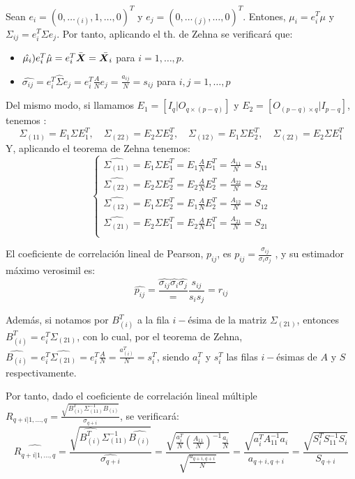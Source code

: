     Sean $e_i = (0,\dots_{(i)},1,\dots,0)^T$ y $e_j = (0,\dots_{(j)},\dots,0)^T$. Entones, $\mu_i = e_i^T \mu$ y $\Sigma_{ij} = e_i^T \Sigma e_j$. Por tanto, aplicando el th. de Zehna se verificará que:
    \begin{itemize}
    \item $\hat{\mu_i} ) e_i^T \hat{\mu} = e_i^T \bar{\boldsymbol{X}} = \bar{\boldsymbol{X}_i}$ para $i = 1,\dots,p$.
      \item $\hat{\sigma_{ij}} = e_i^T \hat{\Sigma}e_j = e_i^T \frac{A}{N}e_j = \frac{a_{ij}}{N} = s_{ij}$ para $i,j = 1,\dots,p$
    \end{itemize}

    Del mismo modo, si llamamos $E_1 =[ I_q | O_{q\times (p-q)}]$ y $E_2 = [O_{(p-q)\times q} | I_{p-q}]$, tenemos :
    \[
\Sigma_{(11)} = E_1 \Sigma E_1^T, \quad \Sigma_{(22)} = E_2 \Sigma E_2^T, \quad \Sigma_{(12)} = E_1 \Sigma E_2^T, \quad  \Sigma_{(22)} = E_2 \Sigma E_1^T
\]
Y, aplicando el teorema de Zehna tenemos:
\[
\begin{cases}
  \hat{\Sigma_{(11)}} = E_1 \Sigma E_1^T = E_1\frac{A}{N}E_1^T = \frac{A_{11}}{N} = S_{11} \\
  \hat{\Sigma_{(22)}} = E_2 \Sigma E_2^T = E_2\frac{A}{N}E_2^T = \frac{A_{22}}{N} = S_{22} \\

  \hat{\Sigma_{(12)}} = E_1 \Sigma E_2^T = E_1\frac{A}{N}E_2^T = \frac{A_{12}}{N} = S_{12} \\
  \hat{\Sigma_{(21)}} = E_2 \Sigma E_1^T = E_2\frac{A}{N}E_1^T = \frac{A_{21}}{N} = S_{21} \\
  \end{cases}
\]


\begin{ndef}
  El coeficiente de correlación lineal de Pearson, $p_{ij}$, es $p_{ij} = \frac{\sigma_{ij}}{\sigma_i \sigma_j}$ , y su estimador máximo verosimil es:
  \[
\hat{p_{ij}} = \frac{\hat{\sigma_{ij}}{\hat{\sigma_i}\hat{\sigma_j}}} = \frac{s_{ij}}{s_i s_j} = r_{ij}
  \]
\end{ndef}

Además, si notamos por $B_{(i)}^T$ a la fila $i-$ésima de la matriz $\Sigma_{(21)}$, entonces $B_{(i)}^T = e_i^T \Sigma_{(21)}$, con lo cual, por el teorema de Zehna, $\hat{B_{(i)}} = e_i^T \hat{\Sigma_{(21)}} = e_i^T \frac{A}{N} = \frac{a_{(i)}^T}{N} = s_i^T $, siendo $a_i^T$ y $s_i^T$ las filas $i-$ésimas de $A$ y $S$ respectivamente.

Por tanto, dado el coeficiente de correlación lineal múltiple $R_{q+i | 1,\dots,q} = \frac{\sqrt{B_{(i)}^T \Sigma_{(11)}^{-1} B_{(i)}}}{\sigma_{q+i}}$, se verificará:
\[
\hat{R_{q+i | 1,\dots,q}} = \frac{\sqrt{\hat{B_{(i)}^T}\hat{ \Sigma_{(11)}^{-1}} \hat{B_{(i)}} } } {\hat{\sigma_{q+i}}} =  \frac{\sqrt{\frac{a_i^T}{N} (\frac{A_{11}}{N})^{-1} \frac{a_i}{N}   }}{\sqrt{\frac{a_{q+i,q+i}}{N}}} = \frac{\sqrt{a_i^T A_{11}^{-1} a_i       }}{a_{q+i,q+i}} = \frac{\sqrt{S_i^T S_{11}^{-1} S_i}}{S_{q+i}}
\]


